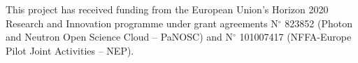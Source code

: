 \documentclass{iucr}              %
\begin{document}




This project has received funding from the European Union’s Horizon 2020 Research and Innovation programme under grant agreements N$^{\circ}$ 823852 (Photon and Neutron Open Science Cloud -- PaNOSC) and N$^{\circ}$ 101007417 (NFFA-Europe Pilot Joint Activities -- NEP).








     
\end{document}
